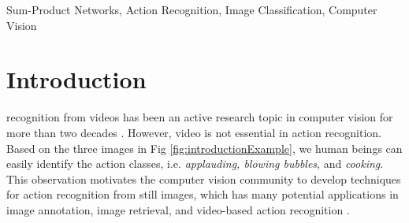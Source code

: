\documentclass[journal]{IEEEtran}
\begin{document}
\begin{IEEEkeywords}
Sum-Product Networks, Action Recognition, Image Classification, Computer Vision
\end{IEEEkeywords}






%
\IEEEpeerreviewmaketitle



\section{Introduction}
% 
% 
% 
% 
%
% 





 recognition from videos has been an active research topic in computer vision for more than two decades \cite{computers2020088,TCSCVT_1,TCSVT_2,TCSVT_3,TCSVT_4,reviewer1_6918650,reviewer1_Baccouche:2011:SDL:2177908.2177914,reviewer1_Dobhal2015178}. However, video is not essential in action recognition. Based on the three images in Fig \ref{fig:introductionExample}, we human beings can easily identify the action classes, i.e. \textit{applauding, blowing bubbles}, and \textit{cooking}. This observation motivates the computer vision community to develop techniques for action recognition from still images, which has many potential applications in image annotation, image retrieval, and video-based action recognition \cite{StillImageSurvey}. 
\end{document}
